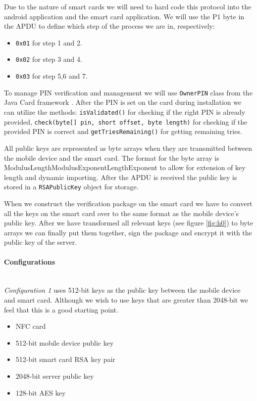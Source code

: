 Due to the nature of smart cards we will need to hard code this protocol into the android application and the smart card application. We will use the P1 byte in the APDU to define which step of the process we are in, respectively:
\begin{itemize}
    \item \texttt{0x01} for step 1 and 2.
    \item \texttt{0x02} for step 3 and 4.
    \item \texttt{0x03} for step 5,6 and 7.
\end{itemize}

To manage PIN verification and management we will use \texttt{OwnerPIN} class from the Java Card framework \cite{ownerpin}. After the PIN is set on the card during installation we can utilize the methods: \texttt{isValidated()} for checking if the right PIN is already provided, \texttt{check(byte[] pin, short offset, byte length)} for checking if the provided PIN is correct and \texttt{getTriesRemaining()} for getting remaining tries.

All public keys are represented as byte arrays when they are transmitted between the mobile device and the smart card. The format for the byte array is \textbar{}ModulusLength\textbar{}Modulus\textbar{}ExponentLength\textbar{}Exponent\textbar{} to allow for extension of key length and dynamic importing. After the APDU is received the public key is stored in a \texttt{RSAPublicKey} object for storage.

When we construct the verification package on the smart card we have to convert all the keys on the smart card over to the same format as the mobile device's public key. After we have transformed all relevant keys (see figure \ref{fig:h0}) to byte arrays we can finally put them together, sign the package and encrypt it with the public key of the server.

\paragraph{Configurations}\mbox{}\\
\textit{Configuration 1} uses 512-bit keys as the public key between the mobile device and smart card. Although we wish to use keys that are greater than 2048-bit we feel that this is a good starting point.
\begin{itemize}
    \item NFC card
    \item 512-bit mobile device public key
    \item 512-bit smart card RSA key pair
    \item 2048-bit server public key
    \item 128-bit AES key
\end{itemize}


